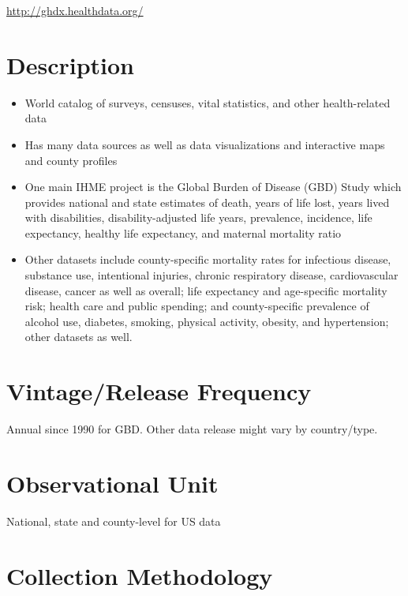\documentclass[
]{book}
\providecommand{\tightlist}{%
  \setlength{\itemsep}{0pt}\setlength{\parskip}{0pt}}
\begin{document}
\url{http://ghdx.healthdata.org/}

\hypertarget{description-29}{%
\section{Description}\label{description-29}}

\begin{itemize}
\tightlist
\item
  World catalog of surveys, censuses, vital statistics, and other health-related data
\item
  Has many data sources as well as data visualizations and interactive maps and county profiles
\item
  One main IHME project is the Global Burden of Disease (GBD) Study which provides national and state estimates of death, years of life lost, years lived with disabilities, disability-adjusted life years, prevalence, incidence, life expectancy, healthy life expectancy, and maternal mortality ratio
\item
  Other datasets include county-specific mortality rates for infectious disease, substance use, intentional injuries, chronic respiratory disease, cardiovascular disease, cancer as well as overall; life expectancy and age-specific mortality risk; health care and public spending; and county-specific prevalence of alcohol use, diabetes, smoking, physical activity, obesity, and hypertension; other datasets as well.
\end{itemize}

\hypertarget{vintagerelease-frequency-29}{%
\section{Vintage/Release Frequency}\label{vintagerelease-frequency-29}}

Annual since 1990 for GBD. Other data release might vary by country/type.

\hypertarget{observational-unit-29}{%
\section{Observational Unit}\label{observational-unit-29}}

National, state and county-level for US data

\hypertarget{collection-methodology-29}{%
\section{Collection Methodology}\label{collection-methodology-29}}
\end{document}
